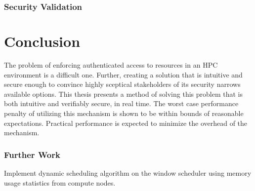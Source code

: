\documentclass[oneside,12pt]{memoir}
\begin{document}
\subsection{Security Validation}
\chapter{Conclusion}
The problem of enforcing authenticated access to resources in an HPC environment is a difficult one. Further, creating a solution that is intuitive and secure enough to convince highly sceptical stakeholders of its security narrows available options. This thesis presents a method of solving this problem that is both intuitive and verifiably secure, in real time. The worst case performance penalty of utilizing this mechanism is shown to be within bounds of reasonable expectations. Practical performance is expected to minimize the overhead of the mechanism. 
\subsection{Further Work}
Implement dynamic scheduling algorithm on the window scheduler using memory usage statistics from compute nodes. 



\end{document}
